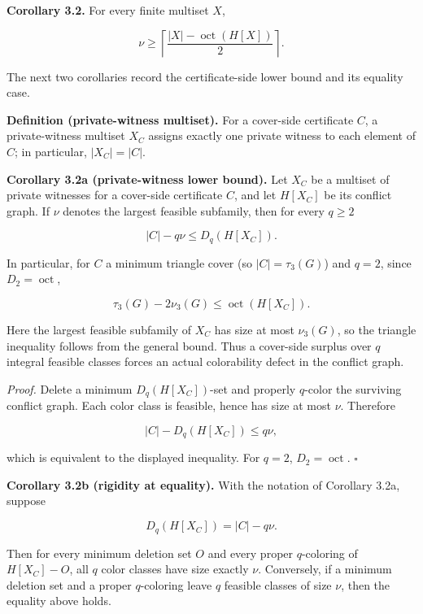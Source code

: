 \documentclass[english,11pt,a4paper]{article}
\begin{document}
\textbf{Corollary 3.2.} For every finite multiset \(X\),

\[
\nu
\ge
\left\lceil
\frac{|X|-\operatorname{oct}(H[X])}{2}
\right\rceil.
\]

The next two corollaries record the certificate-side lower bound and its
equality case.

\textbf{Definition (private-witness multiset).} For a cover-side
certificate \(C\), a private-witness multiset \(X_C\) assigns exactly
one private witness to each element of \(C\); in particular,
\(|X_C|=|C|\).

\textbf{Corollary 3.2a (private-witness lower bound).} Let \(X_C\) be a
multiset of private witnesses for a cover-side certificate \(C\), and
let \(H[X_C]\) be its conflict graph. If \(\nu\) denotes the largest
feasible subfamily, then for every \(q\ge2\)

\[
|C|-q\nu\le D_q(H[X_C]).
\]

In particular, for \(C\) a minimum triangle cover (so \(|C|=\tau_3(G)\))
and \(q=2\), since \(D_2=\operatorname{oct}\),

\[
\tau_3(G)-2\nu_3(G)\le \operatorname{oct}(H[X_C]).
\]

Here the largest feasible subfamily of \(X_C\) has size at most
\(\nu_3(G)\), so the triangle inequality follows from the general bound.
Thus a cover-side surplus over \(q\) integral feasible classes forces an
actual colorability defect in the conflict graph.

\emph{Proof.} Delete a minimum \(D_q(H[X_C])\)-set and properly
\(q\)-color the surviving conflict graph. Each color class is feasible,
hence has size at most \(\nu\). Therefore

\[
|C|-D_q(H[X_C])\le q\nu,
\]

which is equivalent to the displayed inequality. For \(q=2\),
\(D_2=\operatorname{oct}\). \(\square\)

\textbf{Corollary 3.2b (rigidity at equality).} With the notation of
Corollary 3.2a, suppose

\[
D_q(H[X_C])=|C|-q\nu.
\]

Then for every minimum deletion set \(O\) and every proper
\(q\)-coloring of \(H[X_C]-O\), all \(q\) color classes have size
exactly \(\nu\). Conversely, if a minimum deletion set and a proper
\(q\)-coloring leave \(q\) feasible classes of size \(\nu\), then the
equality above holds.
\end{document}
